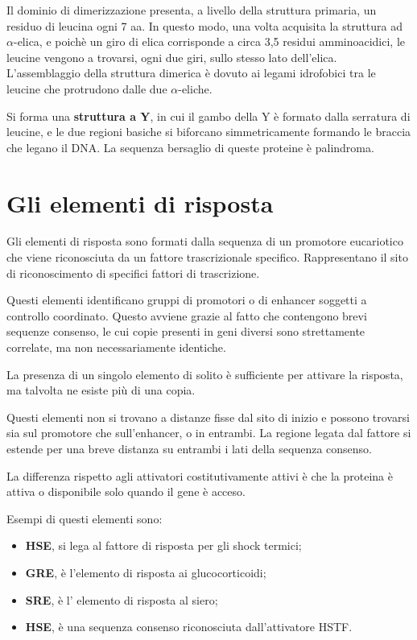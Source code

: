 \documentclass[11pt]{book}
\begin{document}
Il dominio di dimerizzazione presenta, a livello della struttura
primaria, un residuo di leucina ogni 7 aa. In questo modo, una volta
acquisita la struttura ad \(\alpha\)-elica, e poichè un giro di elica
corrisponde a circa 3,5 residui amminoacidici, le leucine vengono a
trovarsi, ogni due giri, sullo stesso lato dell'elica. L'assemblaggio
della struttura dimerica è dovuto ai legami idrofobici tra le leucine
che protrudono dalle due \(\alpha\)-eliche.

Si forma una \textbf{struttura a Y}, in cui il gambo della Y è formato
dalla serratura di leucine, e le due regioni basiche si biforcano
simmetricamente formando le braccia che legano il DNA. La sequenza
bersaglio di queste proteine è palindroma.

\section{Gli elementi di risposta}\label{gli-elementi-di-risposta}

Gli elementi di risposta sono formati dalla sequenza di un promotore
eucariotico che viene riconosciuta da un fattore trascrizionale
specifico. Rappresentano il sito di riconoscimento di specifici fattori
di trascrizione.

Questi elementi identificano gruppi di promotori o di enhancer soggetti
a controllo coordinato. Questo avviene grazie al fatto che contengono
brevi sequenze consenso, le cui copie presenti in geni diversi sono
strettamente correlate, ma non necessariamente identiche.

La presenza di un singolo elemento di solito è sufficiente per attivare
la risposta, ma talvolta ne esiste più di una copia.

Questi elementi non si trovano a distanze fisse dal sito di inizio e
possono trovarsi sia sul promotore che sull'enhancer, o in entrambi. La
regione legata dal fattore si estende per una breve distanza su entrambi
i lati della sequenza consenso.

La differenza rispetto agli attivatori costitutivamente attivi è che la
proteina è attiva o disponibile solo quando il gene è acceso.

Esempi di questi elementi sono:

\begin{itemize}
\itemsep1pt\parskip0pt
\item
  \textbf{HSE}, si lega al fattore di risposta per gli shock termici;
\item
  \textbf{GRE}, è l'elemento di risposta ai glucocorticoidi;
\item
  \textbf{SRE}, è l' elemento di risposta al siero;
\item
  \textbf{HSE}, è una sequenza consenso riconosciuta dall'attivatore
  HSTF.
\end{itemize}
\end{document}
